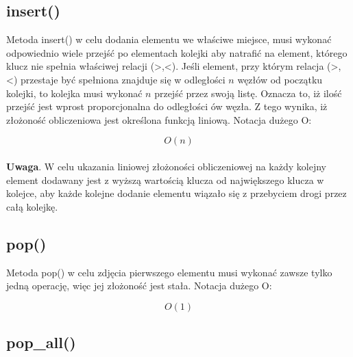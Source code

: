 \documentclass[12pt]{article}
\begin{document}
\begin{multicols}{2}

    \subsection{insert()}
    

\begin{figure}[H]
    \centering
    
\end{figure}
Metoda insert() w celu dodania elementu we właściwe miejsce, musi wykonać odpowiednio wiele przejść po elementach kolejki 
aby natrafić na element, którego klucz nie spełnia właściwej relacji (>,<). Jeśli element, przy którym relacja (>,<)
przestaje być spełniona znajduje się w odległości $n$ węzłów od początku kolejki, to kolejka musi wykonać $n$ przejść 
przez swoją listę. Oznacza to, iż ilość przejść jest wprost proporcjonalna do odległości ów węzła. Z tego wynika, iż
złożoność obliczeniowa jest określona funkcją liniową. Notacja dużego O:

{\Large \begin{equation*}
    O(n)
\end{equation*} }\\
\textbf{Uwaga}. W celu ukazania liniowej złożoności obliczeniowej na każdy kolejny element 
dodawany jest z wyższą wartością klucza od największego klucza w kolejce, aby każde kolejne dodanie elementu 
wiązało się z przebyciem drogi przez całą kolejkę.

\subsection{pop()}
\vspace{1.51cm}

\begin{figure}[H]
    \centering
    
\end{figure}

Metoda pop() w celu zdjęcia pierwszego elementu musi wykonać zawsze 
tylko jedną operację, więc jej złożoność jest stała. Notacja dużego O:

{\Large \begin{equation*}
    O(1)
\end{equation*} }
\newpage
\subsection{pop\_all()}

\begin{figure}[H]
    \centering
    
\end{figure}


\end{multicols}
\end{document}
